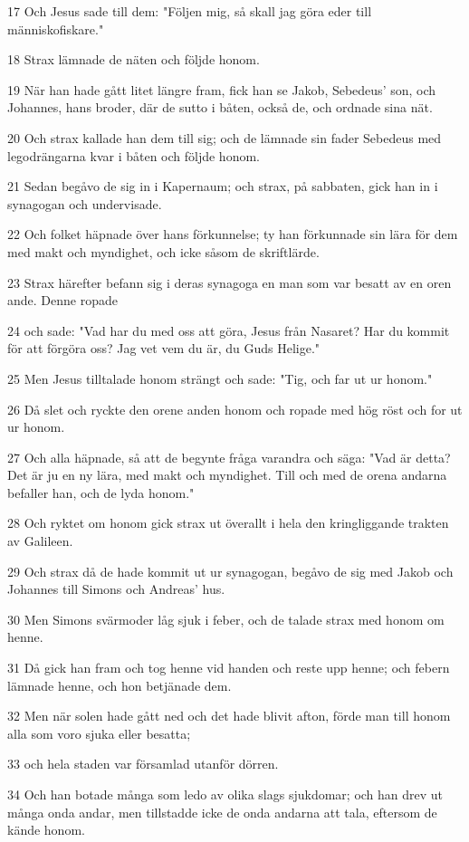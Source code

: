 \par 17 Och Jesus sade till dem: "Följen mig, så skall jag göra eder till människofiskare."
\par 18 Strax lämnade de näten och följde honom.
\par 19 När han hade gått litet längre fram, fick han se Jakob, Sebedeus' son, och Johannes, hans broder, där de sutto i båten, också de, och ordnade sina nät.
\par 20 Och strax kallade han dem till sig; och de lämnade sin fader Sebedeus med legodrängarna kvar i båten och följde honom.
\par 21 Sedan begåvo de sig in i Kapernaum; och strax, på sabbaten, gick han in i synagogan och undervisade.
\par 22 Och folket häpnade över hans förkunnelse; ty han förkunnade sin lära för dem med makt och myndighet, och icke såsom de skriftlärde.
\par 23 Strax härefter befann sig i deras synagoga en man som var besatt av en oren ande. Denne ropade
\par 24 och sade: "Vad har du med oss att göra, Jesus från Nasaret? Har du kommit för att förgöra oss? Jag vet vem du är, du Guds Helige."
\par 25 Men Jesus tilltalade honom strängt och sade: "Tig, och far ut ur honom."
\par 26 Då slet och ryckte den orene anden honom och ropade med hög röst och for ut ur honom.
\par 27 Och alla häpnade, så att de begynte fråga varandra och säga: "Vad är detta? Det är ju en ny lära, med makt och myndighet. Till och med de orena andarna befaller han, och de lyda honom."
\par 28 Och ryktet om honom gick strax ut överallt i hela den kringliggande trakten av Galileen.
\par 29 Och strax då de hade kommit ut ur synagogan, begåvo de sig med Jakob och Johannes till Simons och Andreas' hus.
\par 30 Men Simons svärmoder låg sjuk i feber, och de talade strax med honom om henne.
\par 31 Då gick han fram och tog henne vid handen och reste upp henne; och febern lämnade henne, och hon betjänade dem.
\par 32 Men när solen hade gått ned och det hade blivit afton, förde man till honom alla som voro sjuka eller besatta;
\par 33 och hela staden var församlad utanför dörren.
\par 34 Och han botade många som ledo av olika slags sjukdomar; och han drev ut många onda andar, men tillstadde icke de onda andarna att tala, eftersom de kände honom.
